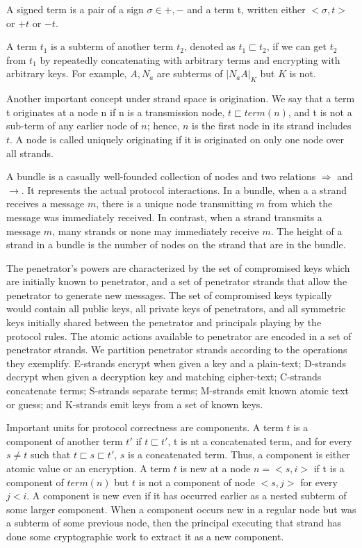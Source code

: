 A signed term is a pair of a sign $\sigma \in {+,-}$ and a term t, written either $<\sigma,t>$ or $+t$ or $-t$.

A term $t_1$ is a subterm of another term $t_2$, denoted as $t_1 \sqsubset t_2$, if we can get $t_2$ from $t_1$ by repeatedly concatenating with arbitrary terms and encrypting with arbitrary keys. For example, $A, N_a$ are subterms of ${|N_aA|}_K$ but $K$ is not.

Another important concept under strand space is origination. We say that a term t originates at a node n if n is a transmission node, $t \sqsubset term(n)$, and t is not a sub-term of any earlier node of $n$; hence, $n$ is the first node in its strand includes $t$. A node is called uniquely originating if it is originated on only one node over all strands.

A bundle is a casually well-founded collection of nodes and two relations $\Rightarrow$ and $\rightarrow$. It represents the actual protocol interactions. In a bundle, when a a strand receives a message $m$, there is a unique node transmitting $m$ from which the message was immediately  received. In contrast, when a strand transmits a message $m$, many strands or none may immediately receive $m$. The height of a strand in a bundle is the number of nodes on the strand that are in the bundle.

The penetrator's powers are characterized by the set of compromised keys which are initially known to penetrator, and a set of penetrator strands that allow the penetrator to generate new messages. The set of compromised keys typically would contain all public keys, all private keys of penetrators, and all symmetric keys initially shared between the penetrator and principals playing by the protocol rules. The atomic actions available to penetrator are encoded in a set of penetrator strands. We partition penetrator strands according to the operations they exemplify. E-strands encrypt when given a key and a plain-text; D-strands decrypt when given a decryption key and matching cipher-text; C-strands concatenate terms; S-strands separate terms; M-strands emit known atomic text or guess; and K-strands emit keys from a set of known keys.

Important units for protocol correctness are components. A term $t$ is a component of another term $t'$ if $t \sqsubset t'$, t is nt a concatenated term, and for every $s \neq t$ such that $t \sqsubset s \sqsubset t'$, $s$ is a concatenated term. Thus, a component is either atomic value or an encryption. A term $t$ is new at a node $n=<s,i>$ if t is a component of $term(n)$ but $t$ is not a component of node $<s,j>$ for every $j < i$. A component is new even if it has occurred earlier as a nested subterm of some larger component. When a component occurs new in a regular node but was a subterm of some previous node, then the principal executing that strand has done some cryptographic work to extract it as a new component. 

